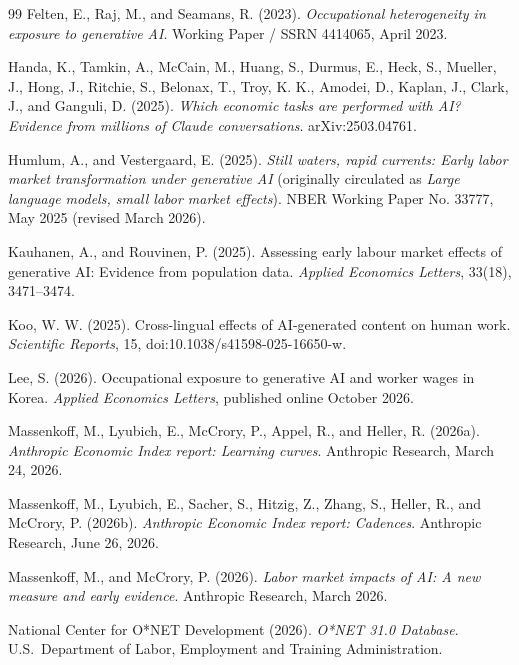 \documentclass[11pt]{amsart}
\begin{document}
\begin{thebibliography}{99}
Felten, E., Raj, M., and Seamans, R. (2023). \emph{Occupational heterogeneity in exposure to generative AI}. Working Paper / SSRN 4414065, April 2023.

Handa, K., Tamkin, A., McCain, M., Huang, S., Durmus, E., Heck, S., Mueller, J., Hong, J., Ritchie, S., Belonax, T., Troy, K. K., Amodei, D., Kaplan, J., Clark, J., and Ganguli, D. (2025). \emph{Which economic tasks are performed with AI? Evidence from millions of Claude conversations}. arXiv:2503.04761.

Humlum, A., and Vestergaard, E. (2025). \emph{Still waters, rapid currents: Early labor market transformation under generative AI} (originally circulated as \emph{Large language models, small labor market effects}). NBER Working Paper No. 33777, May 2025 (revised March 2026).

Kauhanen, A., and Rouvinen, P. (2025). Assessing early labour market effects of generative AI: Evidence from population data. \emph{Applied Economics Letters}, 33(18), 3471--3474.

Koo, W. W. (2025). Cross-lingual effects of AI-generated content on human work. \emph{Scientific Reports}, 15, doi:10.1038/s41598-025-16650-w.

Lee, S. (2026). Occupational exposure to generative AI and worker wages in Korea. \emph{Applied Economics Letters}, published online October 2026.

Massenkoff, M., Lyubich, E., McCrory, P., Appel, R., and Heller, R. (2026a). \emph{Anthropic Economic Index report: Learning curves}. Anthropic Research, March 24, 2026.

Massenkoff, M., Lyubich, E., Sacher, S., Hitzig, Z., Zhang, S., Heller, R., and McCrory, P. (2026b). \emph{Anthropic Economic Index report: Cadences}. Anthropic Research, June 26, 2026.

Massenkoff, M., and McCrory, P. (2026). \emph{Labor market impacts of AI: A new measure and early evidence}. Anthropic Research, March 2026.

National Center for O*NET Development (2026). \emph{O*NET 31.0 Database}. U.S.\ Department of Labor, Employment and Training Administration.


\end{thebibliography}
\end{document}
